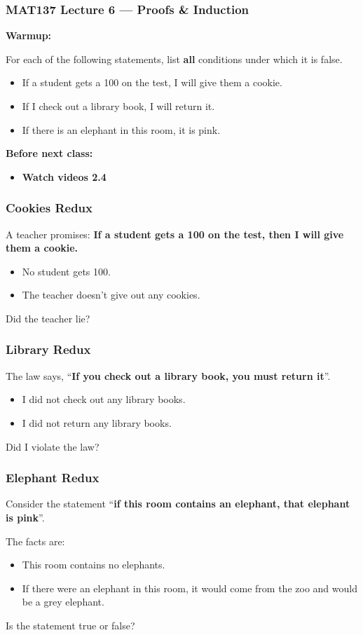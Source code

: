 \documentclass[14pt]{beamer}
\begin{document}
\begin{frame}
	\frametitle{MAT137 Lecture 6 --- Proofs \& Induction}

	{\bf Warmup:}

	For each of the following statements, list {\bf all} conditions under which it is false.
	\begin{itemize}
		\item If a student gets a 100 on the test, I will give them a cookie.
		\item If I check out a library book, I will return it.
		\item If there is an elephant in this room, it is pink.
	\end{itemize}
	\vfill
	{\bf Before next class:}
		\begin{itemize} \normalsize
			\item {\bf Watch videos 2.4 }
		\end{itemize}
	\vfill

\end{frame}

\begin{frame}
\frametitle{Cookies Redux}
	A teacher promises: \textbf{If a student gets a 100 on the test, then I will give them a cookie.}
	\begin{itemize}
		\bigskip
		\item No student gets 100.
		\item The teacher doesn't give out any cookies.
	\end{itemize}
		\vfill
	Did the teacher lie?

\vfill

\end{frame}

\begin{frame}
\frametitle{Library Redux}
	The law says, ``{\bf If you check out a library book, you must return it}''.
	\bigskip
	\begin{itemize}
		\item I did not check out any library books.
		\item I did not return any library books.
	\end{itemize}

	\vfill
	Did I violate the law?
\vfill
\end{frame}

\begin{frame}
\frametitle{Elephant Redux}
	Consider the statement ``{\bf if this room contains an elephant, that elephant is pink}''.

	\bigskip
	The facts are:
	\begin{itemize}
		\item This room contains no elephants.
		\item If there were an elephant in this room, it would come from the zoo and would be a grey elephant.
	\end{itemize}
	\vfill
	Is the statement true or false?
\vfill
\end{frame}
\end{document}
